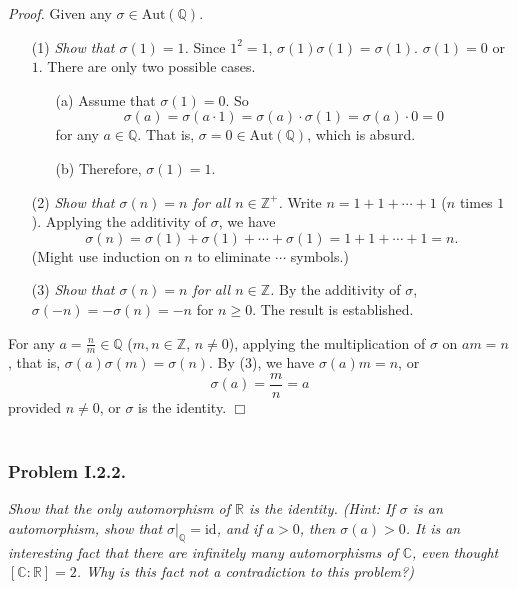 \documentclass{article}
\begin{document}
\emph{Proof.}
Given any $\sigma \in \text{Aut}(\mathbb{Q})$.
\begin{enumerate}
\item[(1)]
\emph{Show that $\sigma(1) = 1$.}
Since $1^2 = 1$, $\sigma(1)\sigma(1) = \sigma(1)$. $\sigma(1) = 0$ or $1$.
There are only two possible cases.
  \begin{enumerate}
  \item[(a)]
  Assume that $\sigma(1) = 0$. So
  $$\sigma(a) = \sigma(a \cdot 1) = \sigma(a)\cdot \sigma(1) = \sigma(a) \cdot 0 = 0$$
  for any $a \in \mathbb{Q}$.
  That is, $\sigma = 0 \in \text{Aut}(\mathbb{Q})$, which is absurd.
  \item[(b)]
  Therefore, $\sigma(1) = 1$.
  \end{enumerate}
\item[(2)]
\emph{Show that $\sigma(n) = n$ for all $n \in \mathbb{Z}^+$.}
Write $n = 1 + 1 + \cdots + 1$ ($n$ times $1$).
Applying the additivity of $\sigma$, we have
$$\sigma(n) = \sigma(1) + \sigma(1) + \cdots + \sigma(1) = 1 + 1 + \cdots + 1 = n.$$
(Might use induction on $n$ to eliminate $\cdots$ symbols.)
\item[(3)]
\emph{Show that $\sigma(n) = n$ for all $n \in \mathbb{Z}$.}
By the additivity of $\sigma$, $\sigma(-n) = -\sigma(n) = -n$ for $n \geq 0$.
The result is established.
\end{enumerate}
For any $a = \frac{n}{m} \in \mathbb{Q}$ ($m, n \in \mathbb{Z}$, $n \neq 0$),
applying the multiplication of $\sigma$ on $am = n$,
that is,
$\sigma(a) \sigma(m) = \sigma(n)$. By (3), we have $\sigma(a)m = n$,
or $$\sigma(a) = \frac{m}{n} = a$$
provided $n \neq 0$,
or $\sigma$ is the identity.
$\Box$ \\\\






\subsubsection*{Problem I.2.2.}
\emph{Show that the only automorphism of $\mathbb{R}$ is the identity.
(Hint: If $\sigma$ is an automorphism, show that $\sigma|_{\mathbb{Q}} = \text{id}$,
and if $a > 0$, then $\sigma(a) > 0$.
It is an interesting fact that there are infinitely many automorphisms of $\mathbb{C}$,
even thought $[\mathbb{C}:\mathbb{R}] = 2$.
Why is this fact not a contradiction to this problem?)} \\
\end{document}
